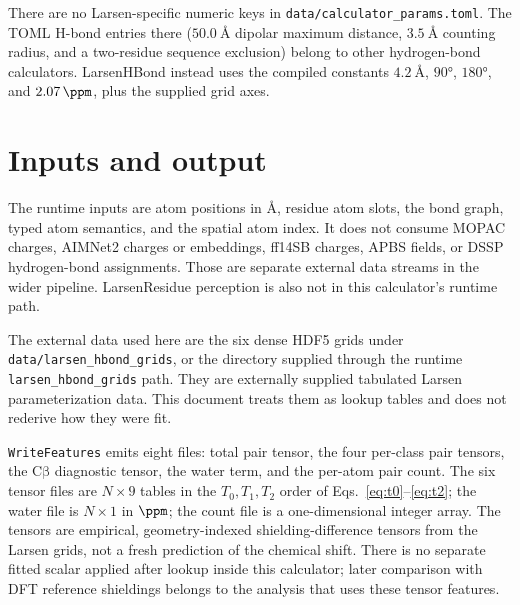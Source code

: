 \documentclass[11pt]{article}
\begin{document}
There are no Larsen-specific numeric keys in
\texttt{data/calculator\_params.toml}. The TOML H-bond entries there
(\(\SI{50.0}{\angstrom}\) dipolar maximum distance,
\(\SI{3.5}{\angstrom}\) counting radius, and a two-residue sequence
exclusion) belong to other hydrogen-bond calculators. LarsenHBond instead
uses the compiled constants \(\SI{4.2}{\angstrom}\), \(\ang{90}\),
\(\ang{180}\), and \(\SI{2.07}{\ppm}\), plus the supplied grid axes.

\section{Inputs and output}

The runtime inputs are atom positions in \(\si{\angstrom}\), residue atom
slots, the bond graph, typed atom semantics, and the spatial atom index. It
does not consume MOPAC charges, AIMNet2 charges or embeddings, ff14SB charges,
APBS fields, or DSSP hydrogen-bond assignments. Those are separate external
data streams in the wider pipeline. LarsenResidue perception is also not in
this calculator's runtime path.

The external data used here are the six dense HDF5 grids under
\texttt{data/larsen\_hbond\_grids}, or the directory supplied through the
runtime \texttt{larsen\_hbond\_grids} path. They are externally supplied
tabulated Larsen parameterization data. This document treats them as lookup
tables and does not rederive how they were fit.

\texttt{WriteFeatures} emits eight files: total pair tensor, the four
per-class pair tensors, the \(\mathrm{C\beta}\) diagnostic tensor, the water
term, and the per-atom pair count. The six tensor files are \(N\times 9\)
tables in the \(T_0,T_1,T_2\) order of Eqs.~\eqref{eq:t0}--\eqref{eq:t2};
the water file is \(N\times 1\) in \(\si{\ppm}\); the count file is a
one-dimensional integer array.
The tensors are empirical, geometry-indexed shielding-difference tensors from
the Larsen grids, not a fresh prediction of the chemical shift. There is no
separate fitted scalar applied after lookup inside this calculator; later
comparison with DFT reference shieldings belongs to the analysis that uses
these tensor features.
\end{document}
